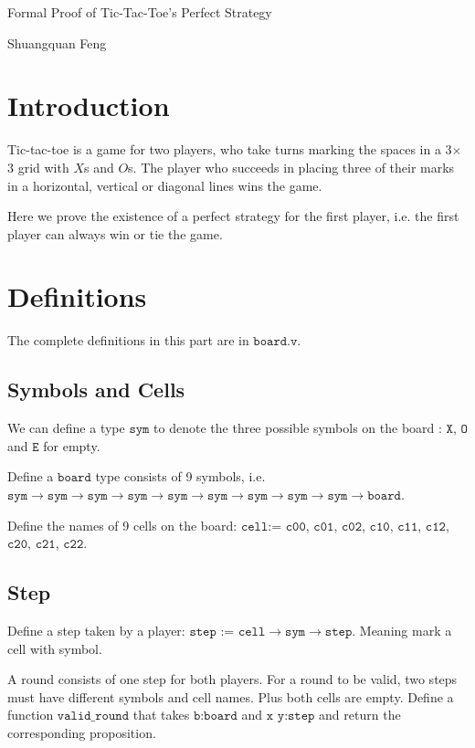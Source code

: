 \documentclass{article}
\begin{document}
\begin{center}
	\Huge{Formal Proof of Tic-Tac-Toe's Perfect Strategy}
	
	\Large{Shuangquan Feng}
\end{center}

\section{Introduction}
Tic-tac-toe is a game for two players, who take turns marking the spaces in a 3$\times$3 grid with $X$s and $O$s. The player who succeeds in placing three of their marks in a horizontal, vertical or diagonal lines wins the game.

Here we prove the existence of a perfect strategy for the first player, i.e. the first player can always win or tie the game.

\section{Definitions}
The complete definitions in this part are in $\texttt{board.v}$.
\subsection{Symbols and Cells}
We can define a type $\texttt{sym}$ to denote the three possible symbols on the board : $\texttt{X}$, $\texttt{O}$ and $\texttt{E}$ for empty.

Define a $\texttt{board}$ type consists of 9 symbols, i.e.$\texttt{sym}\rightarrow\texttt{sym}\rightarrow\texttt{sym}\rightarrow\texttt{sym}\rightarrow\texttt{sym}\rightarrow\texttt{sym}\rightarrow\texttt{sym}\rightarrow\texttt{sym}\rightarrow\texttt{sym}\rightarrow\texttt{board}$.

Define the names of 9 cells on the board: $\texttt{cell}$:= $\texttt{c00}$, $\texttt{c01}$, $\texttt{c02}$, $\texttt{c10}$, $\texttt{c11}$,  $\texttt{c12}$, $\texttt{c20}$, $\texttt{c21}$, $\texttt{c22}$.

\subsection{Step}
Define a step taken by a player: $\texttt{step}$ := $\texttt{cell}\rightarrow\texttt{sym}\rightarrow\texttt{step}$. Meaning mark a cell with symbol.

A round consists of one step for both players. For a round to be valid, two steps must have different symbols and cell names. Plus both cells are empty. Define a function $\texttt{valid\_round}$ that takes $\texttt{b:board}$ and $\texttt{x y:step}$ and return the corresponding proposition.
	
\end{document}
